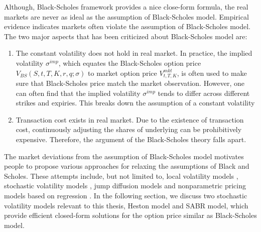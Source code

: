 \documentclass[letterpaper,12pt,titlepage,oneside,final]{book}
\numberwithin{equation}{section}
\theoremstyle{definition}
\begin{document}
Although, Black-Scholes framework provides a nice close-form formula, the real markets are never as ideal as the assumption of Black-Scholes model. Empirical  evidence indicates markets often violate the assumption of   Black-Scholes model. The two major aspects that has been criticized about Black-Scholes model are:
\begin{enumerate}
\item The constant volatility does not hold in real market. In practice, the implied volatility $\sigma^{imp}$, which equates the Black-Scholes option price $V_{BS}(S,t,T,K,r,q;\sigma)$ to market option price $V^{mkt}_{t,T,K}$, is often used to make sure that Black-Scholes price match the market observation. However, one can often find that the implied volatility $\sigma^{imp}$ tends to differ across different strikes and expiries. This breaks down the assumption of a constant volatility
\item Transaction cost exists in real market. Due to the existence of transaction cost, continuously adjusting the shares of underlying can be prohibitively expensive. Therefore, the argument of the Black-Scholes theory falls apart.
\end{enumerate}
The market deviations from the assumption of Black-Scholes model  motivates people to propose various approaches for relaxing the assumptions of Black and Scholes. These attempts include, but not limited to, local volatility models \citep{coleman2001,dumas1998implied,rubinstein1994implied,dupire1994pricing}, stochastic volatility models \cite{hagan2002managing,heston1993closed,hull1987pricing,bakshi1997empirical}, jump diffusion models \citep{He06,kou2002jump} and nonparametric pricing models based on regression \citep{yao2000option,bennell2004black,gradojevic2009option,garcia2000pricing,malliaris1993neural}. In the following section, we discuss two stochastic volatility models relevant to this thesis, Heston model and SABR model, which provide efficient closed-form solutions for the option price similar as Black-Scholes model.
\end{document}
